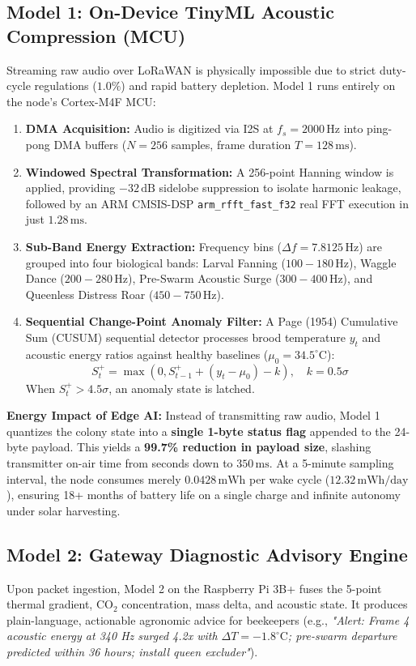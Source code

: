 \documentclass[10pt,conference,letterpaper]{IEEEtran}
\begin{document}
\subsection{Model 1: On-Device TinyML Acoustic Compression (MCU)}
Streaming raw audio over LoRaWAN is physically impossible due to strict duty-cycle regulations ($1.0\%$) and rapid battery depletion. Model 1 runs entirely on the node's Cortex-M4F MCU:
\begin{enumerate}
    \item \textbf{DMA Acquisition:} Audio is digitized via I2S at $f_s = 2000\,\text{Hz}$ into ping-pong DMA buffers ($N = 256$ samples, frame duration $T = 128\,\text{ms}$).
    \item \textbf{Windowed Spectral Transformation:} A 256-point Hanning window is applied, providing $-32\,\text{dB}$ sidelobe suppression to isolate harmonic leakage, followed by an ARM CMSIS-DSP \texttt{arm\_rfft\_fast\_f32} real FFT execution in just $1.28\,\text{ms}$.
    \item \textbf{Sub-Band Energy Extraction:} Frequency bins ($\Delta f = 7.8125\,\text{Hz}$) are grouped into four biological bands: Larval Fanning ($100 - 180\,\text{Hz}$), Waggle Dance ($200 - 280\,\text{Hz}$), Pre-Swarm Acoustic Surge ($300 - 400\,\text{Hz}$), and Queenless Distress Roar ($450 - 750\,\text{Hz}$).
    \item \textbf{Sequential Change-Point Anomaly Filter:} A Page (1954) Cumulative Sum (CUSUM) sequential detector processes brood temperature $y_t$ and acoustic energy ratios against healthy baselines ($\mu_0 = 34.5^\circ\text{C}$):
    \begin{equation}
        S_t^+ = \max(0, S_{t-1}^+ + (y_t - \mu_0) - k), \quad k = 0.5\sigma
    \end{equation}
    When $S_t^+ > 4.5\sigma$, an anomaly state is latched.
\end{enumerate}

\textbf{Energy Impact of Edge AI:} Instead of transmitting raw audio, Model 1 quantizes the colony state into a \textbf{single 1-byte status flag} appended to the 24-byte payload. This yields a \textbf{99.7\% reduction in payload size}, slashing transmitter on-air time from seconds down to $350\,\text{ms}$. At a 5-minute sampling interval, the node consumes merely $0.0428\,\text{mWh}$ per wake cycle ($12.32\,\text{mWh/day}$), ensuring 18+ months of battery life on a single charge and infinite autonomy under solar harvesting.

\subsection{Model 2: Gateway Diagnostic Advisory Engine}
Upon packet ingestion, Model 2 on the Raspberry Pi 3B+ fuses the 5-point thermal gradient, $\text{CO}_2$ concentration, mass delta, and acoustic state. It produces plain-language, actionable agronomic advice for beekeepers (e.g., \textit{"Alert: Frame 4 acoustic energy at 340 Hz surged 4.2x with $\Delta T = -1.8^\circ\text{C}$; pre-swarm departure predicted within 36 hours; install queen excluder"}).
\end{document}
